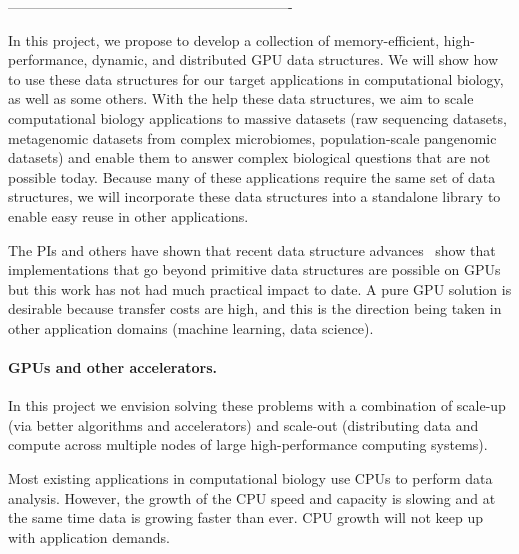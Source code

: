 -------------------------------------------------------------

In this project, we propose to develop a  collection of
memory-efficient, high-performance, dynamic, and distributed GPU data structures.
We will show how to use these data structures for our target applications in computational biology, as well as some others.
With the help these data structures, we aim to scale computational biology applications to massive datasets (raw sequencing datasets, metagenomic datasets from complex microbiomes, population-scale pangenomic datasets) and enable them to answer complex biological questions that are not possible today.
Because many of these applications require the same set of data structures, we will incorporate these data structures into a standalone library to enable easy reuse in other applications.

The PIs and others have shown that recent data structure advances~\cite{cite-somethin} show that
implementations that go beyond primitive data structures are possible on GPUs
but this work has not had much practical impact to date.      A pure GPU solution is
desirable because transfer costs are high, and this is the direction being taken
in other application domains (machine learning, data science).

\paragraph{GPUs and other accelerators.}

In this project we envision solving these problems with a combination of  scale-up (via better algorithms and accelerators) and scale-out (distributing data and compute across multiple nodes of large high-performance computing systems). 


Most existing applications in computational biology use CPUs to perform data  analysis.
However, the growth of the CPU speed and capacity is slowing and at the same time data is growing faster than ever. CPU growth will not keep up with application demands.

